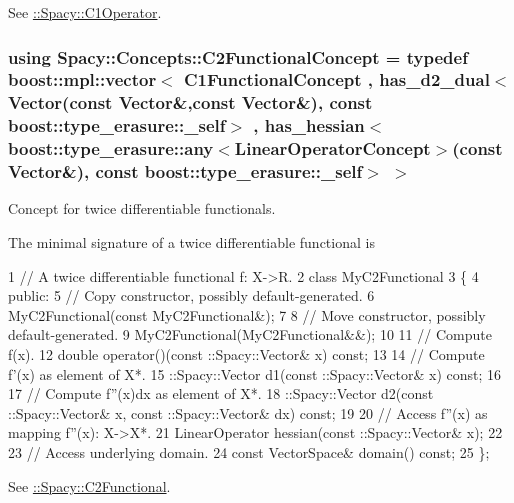 See \hyperlink{group__SpacyGroup_ga87ae8cb0d7a567a4bb181e0a9f182620_C1OperatorAnchor}{\+:\+:Spacy\+:\+:C1\+Operator}. \hypertarget{group__ConceptGroup_gafb4414561b07b27100cad81ecf152e47_gafb4414561b07b27100cad81ecf152e47}{}
\subsubsection[{C2\+Functional\+Concept}]{\setlength{\rightskip}{0pt plus 5cm}using {\bf Spacy\+::\+Concepts\+::\+C2\+Functional\+Concept} = typedef boost\+::mpl\+::vector$<$ {\bf C1\+Functional\+Concept} , has\+\_\+d2\+\_\+dual$<${\bf Vector}(const {\bf Vector}\&,const {\bf Vector}\&), const boost\+::type\+\_\+erasure\+::\+\_\+self$>$ , has\+\_\+hessian$<$boost\+::type\+\_\+erasure\+::any$<${\bf Linear\+Operator\+Concept}$>$(const {\bf Vector}\&), const boost\+::type\+\_\+erasure\+::\+\_\+self$>$ $>$}\label{group__ConceptGroup_gafb4414561b07b27100cad81ecf152e47_gafb4414561b07b27100cad81ecf152e47}


Concept for twice differentiable functionals. 

\label{group__ConceptGroup_gafb4414561b07b27100cad81ecf152e47_C2FunctionalConceptAnchor}%
\hypertarget{group__ConceptGroup_gafb4414561b07b27100cad81ecf152e47_C2FunctionalConceptAnchor}{}%
The minimal signature of a twice differentiable functional is 
\begin{DoxyCode}
1 // A twice differentiable functional f: X->R.
2 class MyC2Functional
3 \{
4 public:
5   // Copy constructor, possibly default-generated.
6   MyC2Functional(const MyC2Functional&);
7 
8   // Move constructor, possibly default-generated.
9   MyC2Functional(MyC2Functional&&);
10 
11   // Compute f(x).
12   double operator()(const ::Spacy::Vector& x) const;
13 
14   // Compute f'(x) as element of X*.
15   ::Spacy::Vector d1(const ::Spacy::Vector& x) const;
16 
17   // Compute f''(x)dx as element of X*.
18   ::Spacy::Vector d2(const ::Spacy::Vector& x, const ::Spacy::Vector& dx) const;
19 
20   // Access f''(x) as mapping f''(x): X->X*.
21   LinearOperator hessian(const ::Spacy::Vector& x);
22 
23   // Access underlying domain.
24   const VectorSpace& domain() const;
25 \};
\end{DoxyCode}


See \hyperlink{group__SpacyGroup_gaf5b89e117806134b06a1ce4629fb2b65_C2FunctionalAnchor}{\+:\+:Spacy\+:\+:C2\+Functional}. \hypertarget{group__ConceptGroup_gadec0c664abaacc2065dadd8b11cc8d30_gadec0c664abaacc2065dadd8b11cc8d30}{}
